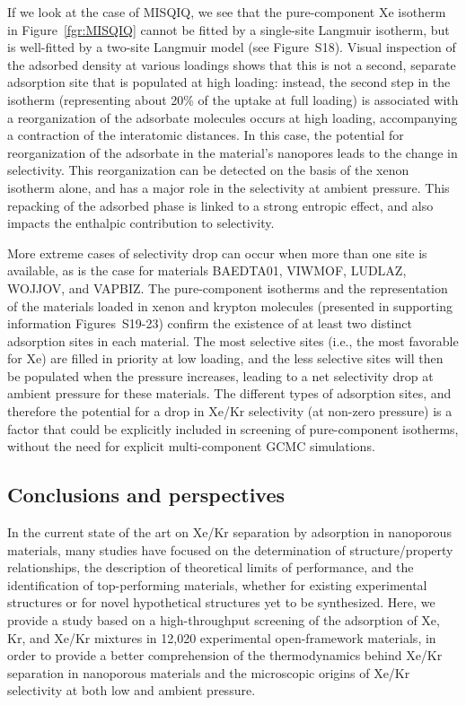 \documentclass[main]{subfiles}
\begin{document}
  If we look at the case of MISQIQ, we see that the pure-component Xe isotherm in Figure~\ref{fgr:MISQIQ} cannot be fitted by a single-site Langmuir isotherm, but is well-fitted by a two-site Langmuir model (see Figure~S18). Visual inspection of the adsorbed density at various loadings shows that this is not a second, separate adsorption site that is populated at high loading: instead, the second step in the isotherm (representing about {20\%} of the uptake at full loading) is associated with a reorganization of the adsorbate molecules occurs at high loading, accompanying a contraction of the interatomic distances. In this case, the potential for reorganization of the adsorbate in the material's nanopores leads to the change in selectivity. This reorganization can be detected on the basis of the xenon isotherm alone, and has a major role in the selectivity at ambient pressure. This repacking of the adsorbed phase is linked to a strong entropic effect, and also impacts the enthalpic contribution to selectivity.
  
  More extreme cases of selectivity drop can occur when more than one site is available, as is the case for materials BAEDTA01, VIWMOF, LUDLAZ, WOJJOV, and VAPBIZ. The pure-component isotherms and the representation of the materials loaded in xenon and krypton molecules (presented in supporting information Figures~S19-23) confirm the existence of at least two distinct adsorption sites in each material. The most selective sites (i.e., the most favorable for Xe) are filled in priority at low loading, and the less selective sites will then be populated when the pressure increases, leading to a net selectivity drop at ambient pressure for these materials. The different types of adsorption sites, and therefore the potential for a drop in Xe/Kr selectivity (at non-zero pressure) is a factor that could be explicitly included in screening of pure-component isotherms, without the need for explicit multi-component GCMC simulations.

  \subsection{Conclusions and perspectives}

  In the current state of the art on Xe/Kr separation by adsorption in nanoporous materials, many studies have focused on the determination of structure/property relationships, the description of theoretical limits of performance, and the identification of top-performing materials, whether for existing experimental structures or for novel hypothetical structures yet to be synthesized. Here, we provide a study based on a high-throughput screening of the adsorption of Xe, Kr, and Xe/Kr mixtures in 12,020 experimental open-framework materials, in order to provide a better comprehension of the thermodynamics behind Xe/Kr separation in nanoporous materials and the microscopic origins of Xe/Kr selectivity at both low and ambient pressure. 
\end{document}
